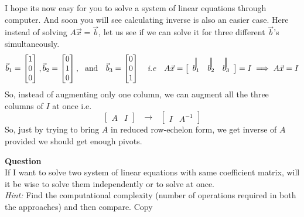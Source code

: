 \documentclass{article}
\newcommand\vstrike[1]{\stackon[0pt]{#1}{\smash{\rule[-3pt]{1pt}{2.9ex}}}}
\begin{document}
I hope its now easy for you to solve a system of linear equations through computer. And soon you will see calculating inverse is also an easier case. Here instead of solving $A\vec{x} = \vec{b}$, let us see if we can solve it for three different $\vec{b}$'s simultaneously.
\[
\vec{b}_1 = \begin{bmatrix}
    1\\0\\0
\end{bmatrix},
\vec{b}_2 = \begin{bmatrix}
    0\\1\\0
\end{bmatrix} ,~~\text{and}~~~
\vec{b}_3 = \begin{bmatrix}
    0\\0\\1
\end{bmatrix}\\
~~~\textit{i.e}~~~ 
A\vec{x} =
\left[\begin{array}{c c c }
    \vstrike{$b_1$} & \vstrike{$b_2$} & \vstrike{$b_3$}\\ 
 \end{array}\right]  = I
\implies A\vec{x} = I
\]
So, instead of augmenting only one column, we can augment all the three columns of $I$ at once i.e.
\[
\left[\begin{array}{c|c}
 A & I
  \end{array}\right]
  ~~~\longrightarrow~~~
  \left[\begin{array}{c|c}
    I & A^{-1}
  \end{array}\right]
\]
So, just by trying to bring $A$ in reduced row-echelon form, we get inverse of $A$ provided we should get enough pivots.

\textbf{Question}\\
If I want to solve two system of linear equations with same coefficient matrix, will it be wise to solve them independently or to solve at once.\\
\textit{Hint:} Find the computational complexity (number of operations required in both the approaches) and then compare.
Copy 
\end{document}
